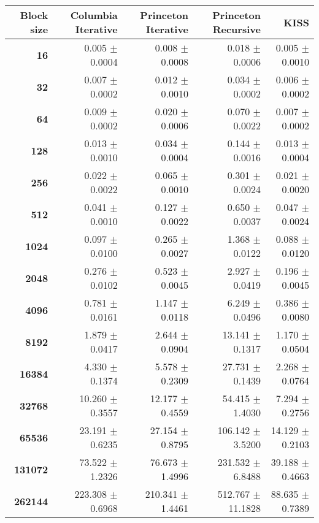 \begin{tabular}{rrrrr}\toprule
    \textbf{Block size} & \textbf{Columbia Iterative} & \textbf{Princeton Iterative} & \textbf{Princeton Recursive} & \textbf{KISS}\\\midrule
\textbf{16}     & 0.005 $\pm$ 0.0004   & 0.008 $\pm$ 0.0008 & 0.018 $\pm$ 0.0006      & 0.005 $\pm$ 0.0010  \\
\textbf{32}     & 0.007 $\pm$ 0.0002   & 0.012 $\pm$ 0.0010 & 0.034 $\pm$ 0.0002      & 0.006 $\pm$ 0.0002  \\
\textbf{64}     & 0.009 $\pm$ 0.0002   & 0.020 $\pm$ 0.0006 & 0.070 $\pm$ 0.0022      & 0.007 $\pm$ 0.0002  \\
\textbf{128}    & 0.013 $\pm$ 0.0010   & 0.034 $\pm$ 0.0004 & 0.144 $\pm$ 0.0016      & 0.013 $\pm$ 0.0004  \\
\textbf{256}    & 0.022 $\pm$ 0.0022   & 0.065 $\pm$ 0.0010 & 0.301 $\pm$ 0.0024      & 0.021 $\pm$ 0.0020  \\
\textbf{512}    & 0.041 $\pm$ 0.0010   & 0.127 $\pm$ 0.0022 & 0.650 $\pm$ 0.0037      & 0.047 $\pm$ 0.0024  \\
\textbf{1024}   & 0.097 $\pm$ 0.0100   & 0.265 $\pm$ 0.0027 & 1.368 $\pm$ 0.0122      & 0.088 $\pm$ 0.0120  \\
\textbf{2048}   & 0.276 $\pm$ 0.0102   & 0.523 $\pm$ 0.0045 & 2.927 $\pm$ 0.0419      & 0.196 $\pm$ 0.0045  \\
\textbf{4096}   & 0.781 $\pm$ 0.0161   & 1.147 $\pm$ 0.0118 & 6.249 $\pm$ 0.0496      & 0.386 $\pm$ 0.0080  \\
\textbf{8192}   & 1.879 $\pm$ 0.0417   & 2.644 $\pm$ 0.0904 & 13.141 $\pm$ 0.1317     & 1.170 $\pm$ 0.0504  \\
\textbf{16384}  & 4.330 $\pm$ 0.1374   & 5.578 $\pm$ 0.2309 & 27.731 $\pm$ 0.1439     & 2.268 $\pm$ 0.0764  \\
\textbf{32768}  & 10.260 $\pm$ 0.3557  & 12.177 $\pm$ 0.4559 & 54.415 $\pm$ 1.4030    & 7.294 $\pm$ 0.2756  \\
\textbf{65536}  & 23.191 $\pm$ 0.6235  & 27.154 $\pm$ 0.8795 & 106.142 $\pm$ 3.5200   & 14.129 $\pm$ 0.2103 \\
\textbf{131072} & 73.522 $\pm$ 1.2326  & 76.673 $\pm$ 1.4996 & 231.532 $\pm$ 6.8488   & 39.188 $\pm$ 0.4663 \\
\textbf{262144} & 223.308 $\pm$ 0.6968 & 210.341 $\pm$ 1.4461 & 512.767 $\pm$ 11.1828 & 88.635 $\pm$ 0.7389 \\
\bottomrule
\end{tabular}

